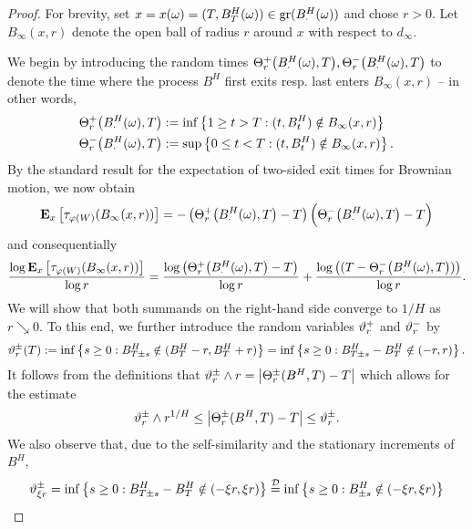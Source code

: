 \begin{proof}
  For brevity, set $x=x(\go)=(T,B^H_T(\go))\in\gr(B^H_\cdot(\go))$ and chose $r>0$. Let $B_\infty(x,r)$ denote the open ball of radius $r$ around $x$ with respect to $d_\infty$.
  
  We begin by introducing the random times 
  $\gT^+_r\big(B^H_\cdot(\go),T\big),
  \gT^-_r\big(B^H_\cdot(\go),T\big)$ to denote the time where the process $B^H$ first exits resp. last enters $B_\infty(x,r)$ -- in other words,
  \begin{align}\label{eq:Theta}
    \gT^+_r\big(B^H_\cdot(\go),T\big)
    &:=\inf\left\{1\geq t>T:(t,B^H_t)\notin B_\infty(x,r)\right\}\notag\\
    \gT^-_r\big(B^H_\cdot(\go),T\big)
    &:=\sup\left\{0\leq t<T:(t,B^H_t)\notin B_\infty(x,r)\right\}.
  \end{align}
  By the standard result for the expectation of two-sided exit times for Brownian motion, we now obtain 
  \[
    \PTEp{\tau_{\gp(W)}(B_\infty(x,r))}{x}
    =-\left(\gT^+_r\big(B^H_\cdot(\go),T\big)-T\right)
      \Big(\gT^-_r\big(B^H_\cdot(\go),T\big)-T\Big)
  \]    
  and consequentially
  \begin{equation}\label{eq:sumoflogs}
    \frac{\log \PTEp{\tau_{\gp(W)}(B_\infty(x,r))}{x}}{\log r}
    =\frac{\log \left(\gT^+_r\big(B^H_\cdot(\go),T\big)-T\right)}{\log r}
     +\frac{\log \left((T-\gT^-_r\big(B^H_\cdot(\go),T\big))\right)}{\log r}.
  \end{equation}
  We will show that both summands on the right-hand side converge to 
  $1/H$ as $r\searrow 0$. To this end, we further introduce the random variables $\gvt_r^+$ and $\gvt_r^-$ by 
  \[
    \gvt_r^\pm(T)
      :=\inf\left\{s\geq0:B^H_{T\pm s}\notin(B^H_T-r,B^H_T+r)\right\}
       =\inf\left\{s\geq0:B^H_{T\pm s}-B^H_T\notin(-r,r)\right\}.
  \]
  It follows from the definitions that 
  $\gvt_r^\pm\wedge r=\left|\gT^\pm_r(B^H,T)-T\right|$
  which allows for the estimate 
  \begin{equation}\label{eq:gvtest1}
    \gvt_r^\pm\wedge r^{1/H}
    \leq \left|\gT^\pm_r(B^H,T)-T\right|
    \leq \gvt_r^{\pm}.
  \end{equation}
  We also observe that, due to the self-similarity and the stationary increments of $B^H$, 
  \begin{align*}
    \gvt_{\xi r}^\pm
     &=\inf\left\{s\geq0:B^H_{T\pm s}-B^H_T\notin(-\xi r,\xi r)\right\}
      \stackrel{\cD}{=}\inf\left\{s\geq0:B^H_{\pm s}\notin
         (-\xi r,\xi r)\right\}\\

\end{align*}
\end{proof}
